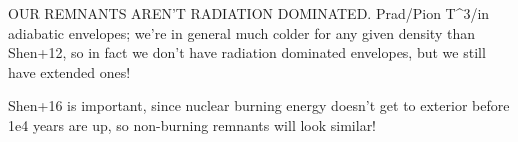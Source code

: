OUR REMNANTS AREN'T RADIATION DOMINATED.  Prad/Pion \propto T^3/\rho \propto \rho in adiabatic envelopes; we're in general much colder for any given density than Shen+12, so in fact we don't have radiation dominated envelopes, but we still have extended ones!

Shen+16 is important, since nuclear burning energy doesn't get to exterior before 1e4 years are up, so non-burning remnants will look similar!







